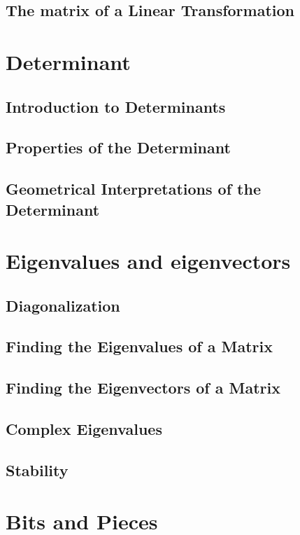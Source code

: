\documentclass{article}
\theoremstyle{definition}
\begin{document}
\subsection{The matrix of a Linear Transformation}

\newpage
\section{Determinant}
\subsection{Introduction to Determinants}
\subsection{Properties of the Determinant}
\subsection{Geometrical Interpretations of the Determinant}

\newpage
\section{Eigenvalues and eigenvectors}
\subsection{Diagonalization}
\subsection{Finding the Eigenvalues of a Matrix}
\subsection{Finding the Eigenvectors of a Matrix}
\subsection{Complex Eigenvalues}
\subsection{Stability}

\newpage
\section{Bits and Pieces}
\end{document}
